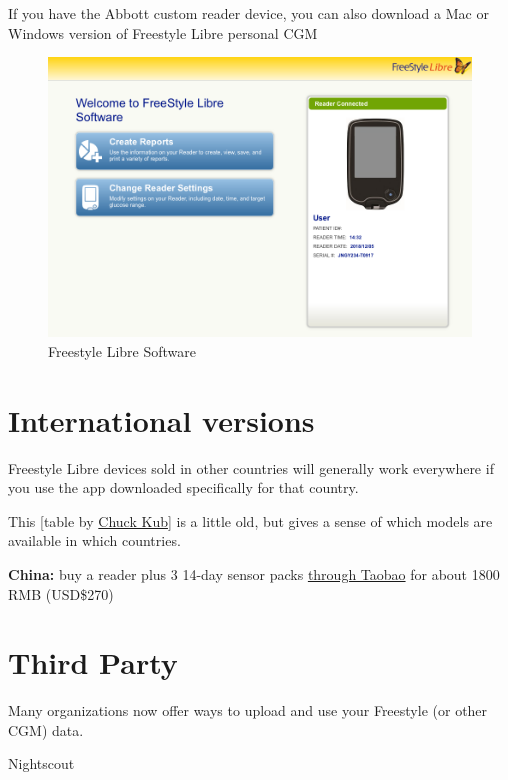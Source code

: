 \documentclass[
]{book}
\begin{document}
If you have the Abbott custom reader device, you can also download a Mac or Windows version of Freestyle Libre personal CGM

\begin{figure}
\centering
\includegraphics{images/freestyle-software.png}
\caption{Freestyle Libre Software}
\end{figure}

\hypertarget{international-versions}{%
\section{International versions}\label{international-versions}}

Freestyle Libre devices sold in other countries will generally work everywhere if you use the app downloaded specifically for that country.

This {[}table by \href{https://www.facebook.com/photo.php?fbid=1835069433269419\&set=gm.751003141928341\&type=3\&theater\&ifg=1}{Chuck Kub}{]} is a little old, but gives a sense of which models are available in which countries.

\textbf{China:} buy a reader plus 3 14-day sensor packs \href{https://item.jd.com/32498232197.html}{through Taobao} for about 1800 RMB (USD\$270)

\hypertarget{third-party}{%
\section{Third Party}\label{third-party}}

Many organizations now offer ways to upload and use your Freestyle (or other CGM) data.

Nightscout
\end{document}
